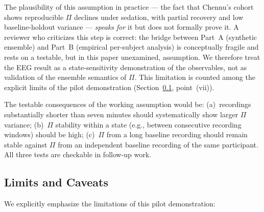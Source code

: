 ﻿\documentclass[11pt,a4paper]{article}
\theoremstyle{plain}
\theoremstyle{definition}
\theoremstyle{remark}
\begin{document}
The plausibility of this assumption in practice --- the fact that Chennu's cohort shows reproducible $\Pi$ declines under sedation, with partial recovery and low baseline-holdout variance --- \emph{speaks for} it but does not formally prove it. A reviewer who criticizes this step is correct: the bridge between Part~A (synthetic ensemble) and Part~B (empirical per-subject analysis) is conceptually fragile and rests on a testable, but in this paper unexamined, assumption. We therefore treat the EEG result as a state-sensitivity demonstration of the observables, not as validation of the ensemble semantics of $\Pi$. This limitation is counted among the explicit limits of the pilot demonstration (Section~\ref{sec:pilot-limits}, point~(vii)).

The testable consequences of the working assumption would be: (a)~recordings substantially shorter than seven minutes should systematically show larger $\Pi$ variance; (b)~$\Pi$ stability within a state (e.g., between consecutive recording windows) should be high; (c)~$\Pi$ from a long baseline recording should remain stable against $\Pi$ from an independent baseline recording of the same participant. All three tests are checkable in follow-up work.

\subsection{Limits and Caveats}
\label{sec:pilot-limits}

We explicitly emphasize the limitations of this pilot demonstration:
\end{document}
